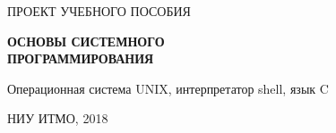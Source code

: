 \begin{titlepage}
	\Large ПРОЕКТ УЧЕБНОГО ПОСОБИЯ
	
	\vspace {4cm}
	
	\Huge\textbf{{\fontsize{30}{30}\selectfont 
	ОСНОВЫ СИСТЕМНОГО
	\\
	ПРОГРАММИРОВАНИЯ}}
	
	\vspace{0.5cm}
	{\large Операционная система UNIX, интерпретатор shell, язык C \par}
	


	\vfill
	{\large НИУ ИТМО, 2018}
	
\end{titlepage}